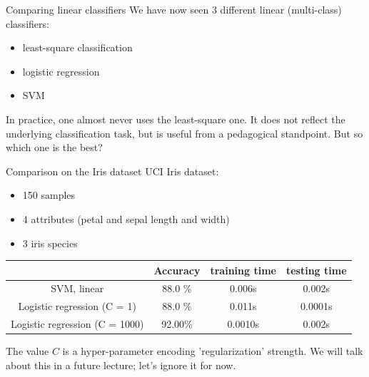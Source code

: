 \begin{parag}{Comparing linear classifiers}
    We have now seen 3 different linear (multi-class) classifiers:
	\begin{itemize}
		\item least-square classification
		\item logistic regression
		\item SVM
	\end{itemize}
	In practice, one almost never uses the least-square one. It does not reflect the underlying classification task, but is useful from a pedagogical standpoint. But so which one is the best?
\end{parag}
\begin{parag}{Comparison on the Iris dataset}
    UCI Iris dataset:
	\begin{itemize}
	    \item 150 samples
	    \item 4 attributes (petal and sepal length and width)
	    \item 3 iris species
	\end{itemize}
	\begin{center}
	\begin{tabular}{|c|c|c|c|}
		\hline
		 & Accuracy & training time & testing time \\
		\hline
		\hline
		SVM, linear & 88.0 \% & 0.006s & 0.002s \\
		\hline
		Logistic regression (C = 1) & 88.0 \% & 0.011s & 0.0001s \\
		\hline
		Logistic regression (C = 1000) & 92.00\% & 0.0010s & 0.002s \\
		\hline
	\end{tabular}
	\end{center}
	The value $C$ is a hyper-parameter encoding 'regularization' strength. We will talk about this in a future lecture; let's ignore it for now.
\end{parag}
